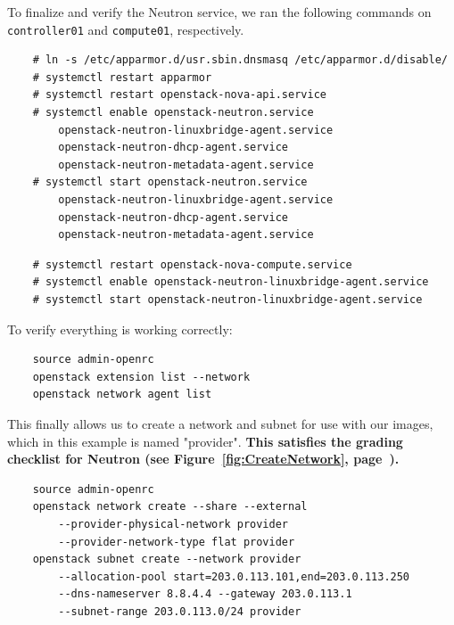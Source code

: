\documentclass{article}
\begin{document}
To finalize and verify the Neutron service, we ran the following commands on \texttt{controller01} and \texttt{compute01}, respectively.

\begin{verbatim}
    # ln -s /etc/apparmor.d/usr.sbin.dnsmasq /etc/apparmor.d/disable/
    # systemctl restart apparmor
    # systemctl restart openstack-nova-api.service
    # systemctl enable openstack-neutron.service
        openstack-neutron-linuxbridge-agent.service
        openstack-neutron-dhcp-agent.service
        openstack-neutron-metadata-agent.service
    # systemctl start openstack-neutron.service
        openstack-neutron-linuxbridge-agent.service
        openstack-neutron-dhcp-agent.service
        openstack-neutron-metadata-agent.service
\end{verbatim}

\begin{verbatim}
    # systemctl restart openstack-nova-compute.service
    # systemctl enable openstack-neutron-linuxbridge-agent.service
    # systemctl start openstack-neutron-linuxbridge-agent.service
\end{verbatim}

To verify everything is working correctly:

\begin{verbatim}
    source admin-openrc
    openstack extension list --network
    openstack network agent list
\end{verbatim}

This finally allows us to create a network and subnet for use with our images, which in this example is named "provider". \textbf{This satisfies the grading checklist for Neutron (see Figure~\ref{fig:CreateNetwork}, page~\pageref{fig:CreateNetwork}).}

\begin{verbatim}
    source admin-openrc
    openstack network create --share --external
        --provider-physical-network provider
        --provider-network-type flat provider
    openstack subnet create --network provider
        --allocation-pool start=203.0.113.101,end=203.0.113.250
        --dns-nameserver 8.8.4.4 --gateway 203.0.113.1
        --subnet-range 203.0.113.0/24 provider
\end{verbatim}
\end{document}
